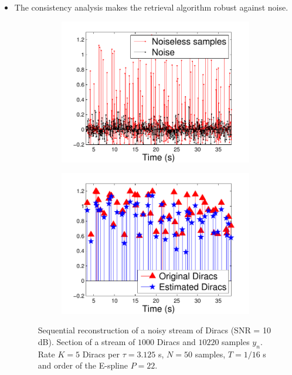 \documentclass[8pt]{beamer}
\begin{document}
\begin{frame}

\begin{itemize}

\item<1-> The consistency analysis makes the retrieval algorithm robust against noise.

\begin{figure}[h]
\begin{subfigure}{.3\textwidth}
\includegraphics[width=\linewidth]{figures/noisy_samples2}
\end{subfigure}
\begin{subfigure}{.3\textwidth}
\includegraphics[width=\linewidth]{figures/noisy_diracs_reconstr}
\end{subfigure}
\caption{Sequential reconstruction of a noisy stream of Diracs (SNR = 10 dB).
Section of a stream of $1000$ Diracs and $10220$ samples $y_n$.
Rate $K=5$ Diracs per $\tau=3.125$ s, $N=50$ samples, $T=1/16$ s and order of the E-spline $P=22$.}
\end{figure}


\end{itemize}
\end{frame}
\end{document}
